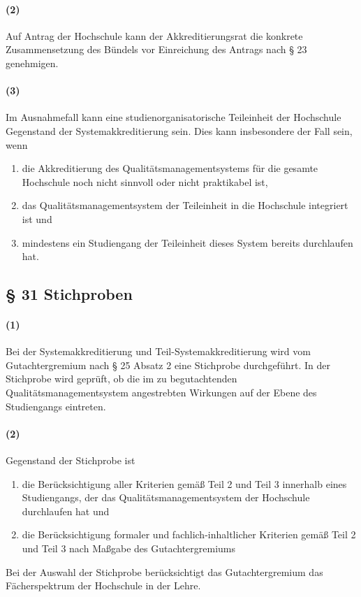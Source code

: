 \documentclass[a4paper]{scrartcl}
\begin{document}
\paragraph{(2)} Auf Antrag der Hochschule kann der Akkreditierungsrat die konkrete Zusammensetzung des Bündels vor Einreichung des Antrags nach § 23 genehmigen.
\paragraph{(3)} Im Ausnahmefall kann eine studienorganisatorische Teileinheit der Hochschule Gegenstand der Systemakkreditierung sein. Dies kann insbesondere der Fall sein, wenn
\begin{enumerate}
\item die Akkreditierung des Qualitätsmanagementsystems für die gesamte
Hochschule noch nicht sinnvoll oder nicht praktikabel ist,
\item das Qualitätsmanagementsystem der Teileinheit in die Hochschule integriert ist und
\item mindestens ein Studiengang der Teileinheit dieses System bereits durchlaufen hat.
\end{enumerate}
\subsection{§ 31 Stichproben}
\paragraph{(1)} Bei der Systemakkreditierung und Teil-Systemakkreditierung wird vom Gutachtergremium nach § 25 Absatz 2 eine Stichprobe durchgeführt. In der Stichprobe wird geprüft, ob die im zu begutachtenden Qualitätsmanagementsystem angestrebten Wirkungen auf der Ebene des Studiengangs eintreten.
\paragraph{(2)} Gegenstand der Stichprobe ist
\begin{enumerate}
\item die Berücksichtigung aller Kriterien gemäß Teil 2 und Teil 3 innerhalb eines Studiengangs, der das Qualitätsmanagementsystem der Hochschule durchlaufen hat und
\item die Berücksichtigung formaler und fachlich-inhaltlicher Kriterien gemäß Teil 2 und Teil 3 nach Maßgabe des Gutachtergremiums
\end{enumerate}
Bei der Auswahl der Stichprobe berücksichtigt das Gutachtergremium das Fächerspektrum der Hochschule in der Lehre.
\end{document}
